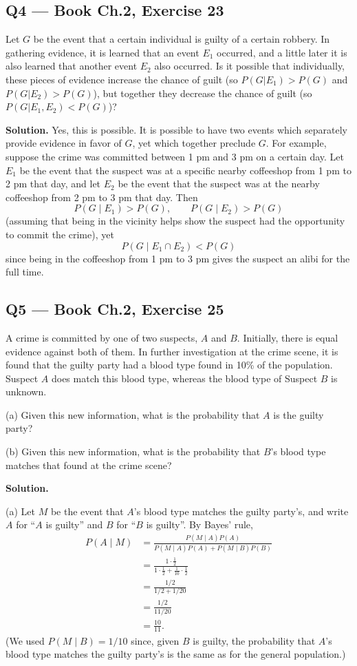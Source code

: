 \documentclass[11pt]{article}
\begin{document}
\subsection*{Q4 --- Book Ch.2, Exercise 23}
\begin{qbox}
Let $G$ be the event that a certain individual is guilty of a certain robbery. In gathering evidence, it is learned that an event $E_1$ occurred, and a little later it is also learned that another event $E_2$ also occurred. Is it possible that individually, these pieces of evidence increase the chance of guilt (so $P(G|E_1) > P(G)$ and $P(G|E_2) > P(G)$), but together they decrease the chance of guilt (so $P(G|E_1, E_2) < P(G)$)?
\end{qbox}
\textbf{Solution.} Yes, this is possible. It is possible to have two events which separately provide evidence in favor of $G$, yet which together preclude $G$. For example, suppose the crime was committed between 1 pm and 3 pm on a certain day. Let $E_1$ be the event that the suspect was at a specific nearby coffeeshop from 1 pm to 2 pm that day, and let $E_2$ be the event that the suspect was at the nearby coffeeshop from 2 pm to 3 pm that day. Then
\[
P(G\mid E_1) > P(G), \qquad P(G\mid E_2) > P(G)
\]
(assuming that being in the vicinity helps show the suspect had the opportunity to commit the crime), yet
\[
P(G\mid E_1 \cap E_2) < P(G)
\]
since being in the coffeeshop from 1 pm to 3 pm gives the suspect an alibi for the full time.

\subsection*{Q5 --- Book Ch.2, Exercise 25}
\begin{qbox}
A crime is committed by one of two suspects, $A$ and $B$. Initially, there is equal evidence against both of them. In further investigation at the crime scene, it is found that the guilty party had a blood type found in 10\% of the population. Suspect $A$ does match this blood type, whereas the blood type of Suspect $B$ is unknown.

(a) Given this new information, what is the probability that $A$ is the guilty party?

(b) Given this new information, what is the probability that $B$'s blood type matches that found at the crime scene?
\end{qbox}
\textbf{Solution.}

(a) Let $M$ be the event that $A$'s blood type matches the guilty party's, and write $A$ for ``$A$ is guilty'' and $B$ for ``$B$ is guilty''. By Bayes' rule,
\begin{align*}
P(A\mid M) &= \frac{P(M\mid A)P(A)}{P(M\mid A)P(A) + P(M\mid B)P(B)} \\
&= \frac{1 \cdot \tfrac12}{1\cdot \tfrac12 + \tfrac{1}{10}\cdot \tfrac12} \\
&= \frac{1/2}{1/2 + 1/20} \\
&= \frac{1/2}{11/20} \\
&= \frac{10}{11}.
\end{align*}
(We used $P(M\mid B) = 1/10$ since, given $B$ is guilty, the probability that $A$'s blood type matches the guilty party's is the same as for the general population.)
\end{document}
